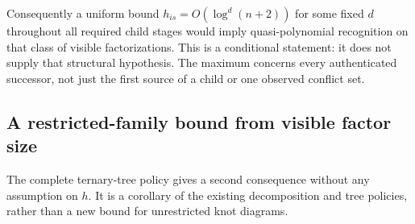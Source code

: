Consequently a uniform bound
$h_{is}=O(\log^d(n+2))$ for some fixed $d$ throughout all required child
stages would imply quasi-polynomial recognition on that class of visible
factorizations.  This is a conditional statement: it does not supply that
structural hypothesis.  The maximum concerns every authenticated successor,
not just the first source of a child or one observed conflict set.

\subsection{A restricted-family bound from visible factor size}

The complete ternary-tree policy gives a second consequence without any
assumption on $h$.  It is a corollary of the existing decomposition and
tree policies, rather than a new bound for unrestricted knot diagrams.

